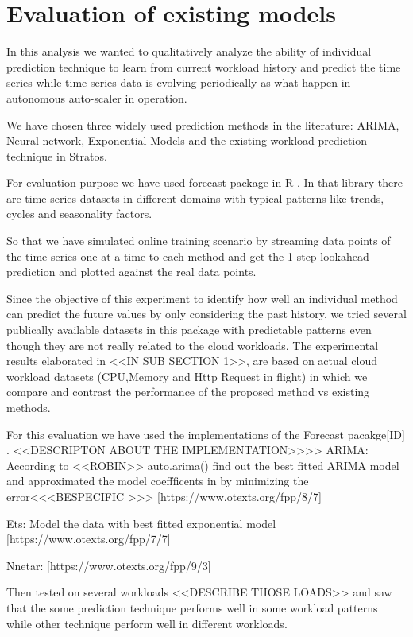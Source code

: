 \section{Evaluation of existing models}
In this analysis we wanted to qualitatively analyze the ability of individual prediction technique to learn from current workload history and predict the time series while time series data is evolving periodically as what happen in autonomous auto-scaler in operation.

We have chosen three widely used prediction methods in the literature: ARIMA, Neural network, Exponential Models and the existing workload prediction technique in Stratos.


For evaluation purpose we have used forecast package in R \cite{}. In that library there are time series datasets in different domains with typical patterns like trends, cycles and seasonality factors. 

So that we have simulated online training scenario by streaming data points of the time series one at a time to each method and get the 1-step lookahead prediction and plotted against the real data points. 

Since the objective of this experiment to identify  how well an individual method can predict the future values by only considering the past history, we tried several publically available datasets in this package with predictable patterns even though they are not really related to the cloud workloads. The experimental results elaborated in <<IN SUB SECTION 1>>, are based on actual cloud workload datasets (CPU,Memory and Http Request in flight)  in which we  compare and contrast the performance of the proposed method vs existing methods. 


For this evaluation we have used the implementations of the Forecast pacakge[ID] . <<DESCRIPTON ABOUT THE IMPLEMENTATION>>>>
ARIMA: According to <<ROBIN>> auto.arima()  find out the best fitted ARIMA model and approximated the model coeffficents in by minimizing the error<<<BESPECIFIC >>> [https://www.otexts.org/fpp/8/7]

Ets: Model the data with best fitted exponential model [https://www.otexts.org/fpp/7/7]

    \cite{Wagner_2011}
    
	Nnetar: [https://www.otexts.org/fpp/9/3]

Then tested on several workloads <<DESCRIBE THOSE LOADS>> and saw that the some prediction technique performs well in some workload patterns while other technique perform well in different workloads.
